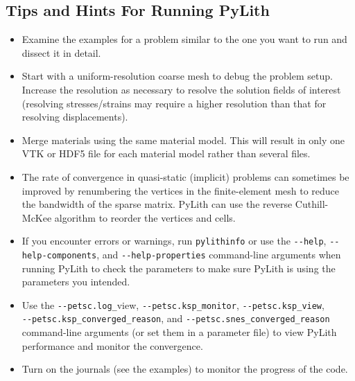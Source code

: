 \subsection{Tips and Hints For Running PyLith}
\begin{itemize}
\item Examine the examples for a problem similar to the one you want to
run and dissect it in detail.
\item Start with a uniform-resolution coarse mesh to debug the problem setup.
Increase the resolution as necessary to resolve the solution fields
of interest (resolving stresses/strains may require a higher resolution
than that for resolving displacements).
\item Merge materials using the same material model. This will result in
only one VTK or HDF5 file for each material model rather than several
files.
\item The rate of convergence in quasi-static (implicit) problems can sometimes
be improved by renumbering the vertices in the finite-element mesh
to reduce the bandwidth of the sparse matrix. PyLith can use the reverse
Cuthill-McKee algorithm to reorder the vertices and cells.
\item If you encounter errors or warnings, run \texttt{pylithinfo} or use
the \texttt{-{}-help}, \texttt{-{}-help-components}, and \texttt{-{}-help-properties}
command-line arguments when running PyLith to check the parameters
to make sure PyLith is using the parameters you intended.
\item Use the \texttt{-{}-petsc.log\_}view, \texttt{-{}-petsc.ksp\_monitor},
\texttt{-{}-petsc.ksp\_view}, \texttt{}~\\
\texttt{-{}-petsc.ksp\_converged\_reason}, and \texttt{-{}-petsc.snes\_converged\_reason}
command-line arguments (or set them in a parameter file) to view PyLith
performance and monitor the convergence.
\item Turn on the journals (see the examples) to monitor the progress of
the code.
\end{itemize}

